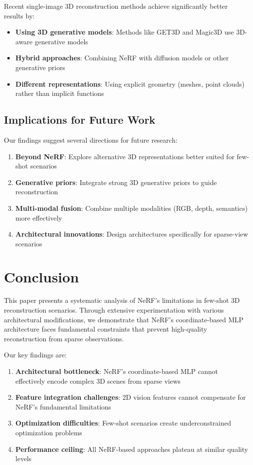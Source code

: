 \documentclass[11pt]{article}
\begin{document}
Recent single-image 3D reconstruction methods achieve significantly better results by:
\begin{itemize}
    \item \textbf{Using 3D generative models}: Methods like GET3D \cite{gao2022get3d} and Magic3D \cite{lin2023magic3d} use 3D-aware generative models
    \item \textbf{Hybrid approaches}: Combining NeRF with diffusion models or other generative priors
    \item \textbf{Different representations}: Using explicit geometry (meshes, point clouds) rather than implicit functions
\end{itemize}

\subsection{Implications for Future Work}

Our findings suggest several directions for future research:

\begin{enumerate}
    \item \textbf{Beyond NeRF}: Explore alternative 3D representations better suited for few-shot scenarios
    \item \textbf{Generative priors}: Integrate strong 3D generative priors to guide reconstruction
    \item \textbf{Multi-modal fusion}: Combine multiple modalities (RGB, depth, semantics) more effectively
    \item \textbf{Architectural innovations}: Design architectures specifically for sparse-view scenarios
\end{enumerate}

\section{Conclusion}

This paper presents a systematic analysis of NeRF's limitations in few-shot 3D reconstruction scenarios. Through extensive experimentation with various architectural modifications, we demonstrate that NeRF's coordinate-based MLP architecture faces fundamental constraints that prevent high-quality reconstruction from sparse observations.

Our key findings are:
\begin{enumerate}
    \item \textbf{Architectural bottleneck}: NeRF's coordinate-based MLP cannot effectively encode complex 3D scenes from sparse views
    \item \textbf{Feature integration challenges}: 2D vision features cannot compensate for NeRF's fundamental limitations
    \item \textbf{Optimization difficulties}: Few-shot scenarios create underconstrained optimization problems
    \item \textbf{Performance ceiling}: All NeRF-based approaches plateau at similar quality levels
\end{enumerate}
\end{document}
